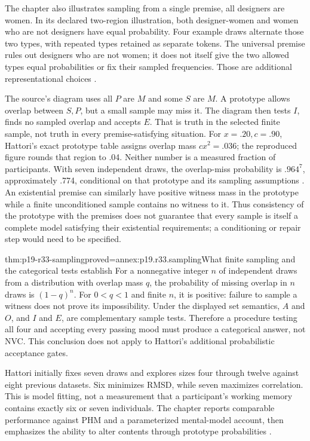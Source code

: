 The chapter also illustrates sampling from a single premise, all designers
are women. In its declared two-region illustration, both designer-women
and women who are not designers have equal probability. Four example
draws alternate those two types, with repeated types retained as separate
tokens. The universal premise rules out designers who are not women;
it does not itself give the two allowed types equal probabilities or
fix their sampled frequencies. Those are additional representational
choices \cite[p.~230]{Khemlani2021Syllogistic}.

The source's diagram uses all \(P\) are \(M\) and some \(S\)
are \(M\). A prototype allows overlap between \(S,P\), but a small
sample may miss it. The diagram then tests \(I\), finds no sampled
overlap and accepts \(E\). That is truth in the selected finite sample,
not truth in every premise-satisfying situation. For \(x=.20,c=.90\),
Hattori's exact prototype table assigns overlap mass \(cx^2=.036\);
the reproduced figure rounds that region to .04. Neither number is a
measured fraction of participants. With seven independent draws, the
overlap-miss probability is \(.964^7\), approximately .774, conditional
on that prototype and its sampling assumptions
\cite[p.~231, Figure~3.3.2]{Khemlani2021Syllogistic}
\cite[pp.~300--304, Table~2]{Hattori2016PRM}.
An existential premise can similarly have positive witness mass in the
prototype while a finite unconditioned sample contains no witness to it.
Thus consistency of the prototype with the premises does not guarantee
that every sample is itself a complete model satisfying their existential
requirements; a conditioning or repair step would need to be specified.

\begin{hblemma}{thm:p19-r33-sampling}{proved=annex:p19.r33.sampling}{What finite sampling and the categorical tests establish}
For a nonnegative integer \(n\) of independent draws from a distribution
with overlap mass \(q\),
the probability of missing overlap in \(n\) draws is \((1-q)^n\).
For \(0<q<1\) and finite \(n\), it is positive: failure to sample a
witness does not prove its impossibility. Under the displayed set semantics,
\(A\) and \(O\), and \(I\) and \(E\), are complementary
sample tests. Therefore a procedure testing all four and accepting every
passing mood must produce a categorical answer, not NVC. This conclusion
does not apply to Hattori's additional probabilistic acceptance gates.
\end{hblemma}

Hattori initially fixes seven draws and explores sizes four through twelve
against eight previous datasets. Six minimizes RMSD, while seven maximizes
correlation. This is model fitting, not a measurement that a participant's
working memory contains exactly six or seven individuals. The chapter
reports comparable performance against PHM and a parameterized mental-model
account, then emphasizes the ability to alter contents through prototype
probabilities \cite[p.~230]{Khemlani2021Syllogistic}
\cite[p.~312, Figure~14]{Hattori2016PRM}.

